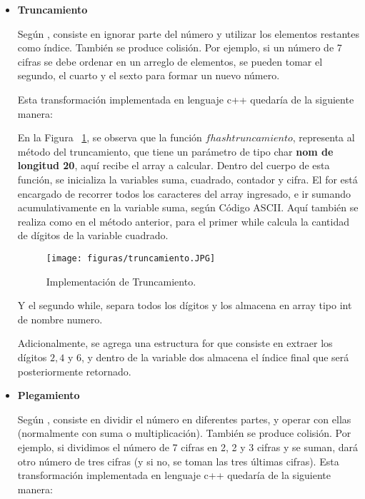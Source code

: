 \documentclass[10pt,conference]{IEEEtran}
\begin{document}
\begin{enumerate}[]
\begin{itemize}
        \item {\textbf{Truncamiento}}
        \par Según \citep{wiki}, consiste en ignorar parte del número y utilizar los elementos restantes como índice. También se produce colisión. Por ejemplo, si un número de 7 cifras se debe ordenar en un arreglo de elementos, se pueden tomar el segundo, el cuarto y el sexto para formar un nuevo número.
        
        Esta transformación implementada en lenguaje c++ quedaría de la siguiente manera:
        
        En la Figura ~\ref{trun}, se observa que la función $fhash truncamiento$, representa al método del truncamiento, que tiene un parámetro de tipo char \textbf{nom de longitud 20}, aquí recibe el array a calcular. Dentro del cuerpo de esta función, se inicializa la variables suma, cuadrado, contador y cifra. El for está encargado de recorrer todos los caracteres del array ingresado, e ir sumando acumulativamente en la variable suma, según Código ASCII.
        Aquí también se realiza como en el método anterior, para el primer while calcula la cantidad de dígitos de la variable cuadrado. 
        
        \begin{figure}[H]
        \begin{center}
            \texttt{[image: figuras/truncamiento.JPG]}
            \caption{Implementación de Truncamiento.}
            \label{trun} 
        \end{center}
        \end{figure}
        
         Y el segundo while, separa todos los dígitos y los almacena en array tipo int de nombre numero.
        
        Adicionalmente, se agrega una estructura for que consiste en extraer los dígitos $2, 4$ y $6$, y dentro de la variable dos almacena el índice final que será posteriormente retornado.
        
        \item {\textbf{Plegamiento}}
        \par Según \citep{wiki}, consiste en dividir el número en diferentes partes, y operar con ellas (normalmente con suma o multiplicación). También se produce colisión. Por ejemplo, si dividimos el número de 7 cifras en 2, 2 y 3 cifras y se suman, dará otro número de tres cifras (y si no, se toman las tres últimas cifras).
        Esta transformación implementada en lenguaje c++ quedaría de la siguiente manera:
        

\end{itemize}
\end{enumerate}
\end{document}
